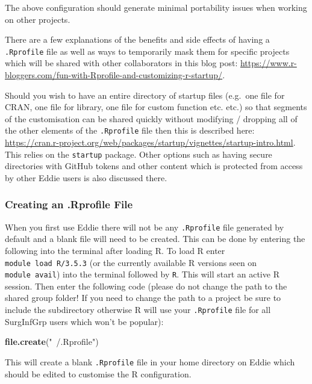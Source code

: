 \documentclass[]{book}
\newenvironment{Shaded}{\begin{snugshade}}{\end{snugshade}}
\newcommand{\KeywordTok}[1]{\textcolor[rgb]{0.13,0.29,0.53}{\textbf{#1}}}
\newcommand{\NormalTok}[1]{#1}
\newcommand{\StringTok}[1]{\textcolor[rgb]{0.31,0.60,0.02}{#1}}
\begin{document}
The above configuration should generate minimal portability issues when working on other projects.

There are a few explanations of the benefits and side effects of having a \texttt{.Rprofile} file as well as ways to temporarily mask them for specific projects which will be shared with other collaborators in this blog post: \url{https://www.r-bloggers.com/fun-with-Rprofile-and-customizing-r-startup/}.

Should you wish to have an entire directory of startup files (e.g.~one file for CRAN, one file for library, one file for custom function etc. etc.) so that segments of the customisation can be shared quickly without modifying / dropping all of the other elements of the \texttt{.Rprofile} file then this is described here: \url{https://cran.r-project.org/web/packages/startup/vignettes/startup-intro.html}. This relies on the \texttt{startup} package. Other options such as having secure directories with GitHub tokens and other content which is protected from access by other Eddie users is also discussed there.

\hypertarget{creating-an-.rprofile-file}{%
\subsubsection{Creating an .Rprofile File}\label{creating-an-.rprofile-file}}

When you first use Eddie there will not be any \texttt{.Rprofile} file generated by default and a blank file will need to be created. This can be done by entering the following into the terminal after loading R. To load R enter \texttt{module\ load\ R/3.5.3} (or the currently available R versions seen on \texttt{module\ avail}) into the terminal followed by \texttt{R}. This will start an active R session. Then enter the following code (please do not change the path to the shared group folder! If you need to change the path to a project be sure to include the subdirectory otherwise R will use your \texttt{.Rprofile} file for all SurgInfGrp users which won't be popular):

\begin{Shaded}
\begin{Highlighting}[]
\KeywordTok{file.create}\NormalTok{(}\StringTok{"~/.Rprofile"}\NormalTok{)}
\end{Highlighting}
\end{Shaded}

This will create a blank \texttt{.Rprofile} file in your home directory on Eddie which should be edited to customise the R configuration.
\end{document}
